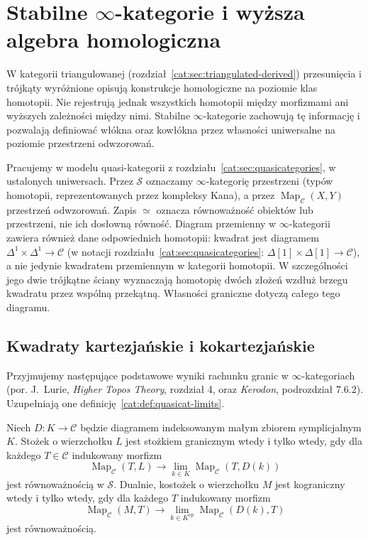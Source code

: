 \section{\texorpdfstring{Stabilne $\infty$-kategorie}{Stabilne kategorie nieskończonego rzędu} i wyższa algebra homologiczna}\label{cat:sec:stable-infty-categories}

W kategorii triangulowanej (rozdział~\ref{cat:sec:triangulated-derived}) przesunięcia i trójkąty wyróżnione opisują konstrukcje homologiczne na poziomie klas homotopii. Nie rejestrują jednak wszystkich homotopii między morfizmami ani wyższych zależności między nimi. Stabilne $\infty$-kategorie zachowują tę informację i pozwalają definiować włókna oraz kowłókna przez własności uniwersalne na poziomie przestrzeni odwzorowań.

Pracujemy w modelu quasi-kategorii z rozdziału~\ref{cat:sec:quasicategories}, w ustalonych uniwersach. Przez $\mathcal S$ oznaczamy $\infty$-kategorię przestrzeni (typów homotopii, reprezentowanych przez kompleksy Kana), a przez $\operatorname{Map}_{\mathcal C}(X,Y)$ przestrzeń odwzorowań. Zapis $\simeq$ oznacza równoważność obiektów lub przestrzeni, nie ich dosłowną równość. Diagram przemienny w $\infty$-kategorii zawiera również dane odpowiednich homotopii: kwadrat jest diagramem $\Delta^1\times\Delta^1\to\mathcal C$ (w notacji rozdziału~\ref{cat:sec:quasicategories}: $\Delta[1]\times\Delta[1]\to\mathcal C$), a nie jedynie kwadratem przemiennym w kategorii homotopii. W szczególności jego dwie trójkątne ściany wyznaczają homotopię dwóch złożeń wzdłuż brzegu kwadratu przez wspólną przekątną. Własności graniczne dotyczą całego tego diagramu.

\subsection{Kwadraty kartezjańskie i kokartezjańskie}

Przyjmujemy następujące podstawowe wyniki rachunku granic w $\infty$-kategoriach (por. J.~Lurie, \emph{Higher Topos Theory}, rozdział 4, oraz \emph{Kerodon}, podrozdział 7.6.2). Uzupełniają one definicję~\ref{cat:def:quasicat-limits}.

\begin{twierdzenie}\label{cat:thm:stable-mapping-limit}
Niech $D:K\to\mathcal C$ będzie diagramem indeksowanym małym zbiorem symplicjalnym $K$. Stożek o wierzchołku $L$ jest stożkiem granicznym wtedy i tylko wtedy, gdy dla każdego $T\in\mathcal C$ indukowany morfizm
\[
 \operatorname{Map}_{\mathcal C}(T,L)\longrightarrow
 \lim_{k\in K}\operatorname{Map}_{\mathcal C}(T,D(k))
\]
jest równoważnością w $\mathcal S$. Dualnie, kostożek o wierzchołku $M$ jest kograniczny wtedy i tylko wtedy, gdy dla każdego $T$ indukowany morfizm
\[
 \operatorname{Map}_{\mathcal C}(M,T)\longrightarrow
 \lim_{k\in K^{\mathrm{op}}}\operatorname{Map}_{\mathcal C}(D(k),T)
\]
jest równoważnością.
\end{twierdzenie}

